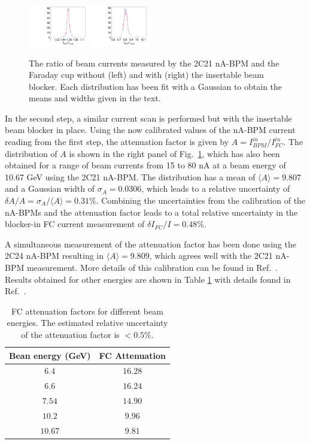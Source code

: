 \begin{figure}[ht]
\begin{center}
\includegraphics[width=0.23\textwidth]{fCup_2C21_ratio_highcurr.pdf}
\includegraphics[width=0.23\textwidth]{BB_attenuation_2c21_highcurr.pdf}
\caption{The ratio of beam currents measured by the 2C21 nA-BPM and the Faraday cup without (left) and with (right)  the insertable beam
 blocker. Each distribution has been fit with a Gaussian to obtain the means and widths given in the text.}
\label{fig:2c21fc}
\end{center}
\end{figure}

 
In the second step, a similar current scan is performed but with the insertable beam blocker in place. Using the now
calibrated values of the nA-BPM current reading from the first step, the attenuation factor is given by 
$A=I_{BPM}^{in}/{I_{FC}^{in}}$.
The distribution of $A$ is shown in the right panel of Fig.~\ref{fig:2c21fc}, which has also been  obtained for a range of beam 
currents from 15 to 80 nA at a beam energy of 10.67 GeV using the 2C21 nA-BPM.  The distribution has a mean of $\langle A\rangle=9.807$
and a  Gaussian width of $\sigma_A=0.0306$, which leads to a relative uncertainty of $\delta A/A=\sigma_A/\langle A\rangle=0.31$\%. 
Combining the uncertainties from the calibration of the nA-BPMs and the attenuation factor leads to a total relative uncertainty in the 
blocker-in FC current measurement of $\delta I_{FC}/I=0.48$\%. 

A simultaneous measurement of the attenuation factor has been done using the 2C24 nA-BPM resulting in  $\langle A\rangle=9.809$,
which agrees well with the 2C21 nA-BPM measurement. More details of this calibration can be found in Ref.~\cite{note107}. Results obtained 
for other energies are shown in Table \ref{tab:fcatt} with details found in Ref.~\cite{notes}.  

\begin{table}[htb]
 \centering
 \begin{tabular}{|c|c|}
\hline
Bean energy (GeV)& FC Attenuation \\ \hline
$6.4$ &    $16.28$  \\ \hline
$6.6$ &  $16.24$ \\ \hline 
$7.54$  & $14.90$ \\ \hline 
$10.2$  & $9.96$ \\ \hline 
$10.67$   &  $9.81$ \\ \hline 
\end{tabular}
\caption{FC attenuation factors for different beam energies. The estimated relative uncertainty of the attenuation factor is $<0.5$\%.} 
\label{tab:fcatt}
\end{table}


